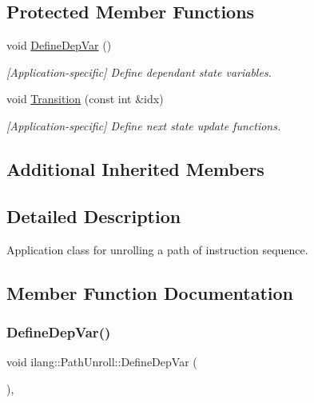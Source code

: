 \subsection*{Protected Member Functions}
\begin{DoxyCompactItemize}
\item 
void \mbox{\hyperlink{classilang_1_1_path_unroll_a862b0d21850b43ff4da423eaf37dc18f}{Define\+Dep\+Var}} ()
\begin{DoxyCompactList}\small\item\em \mbox{[}Application-\/specific\mbox{]} Define dependant state variables. \end{DoxyCompactList}\item 
void \mbox{\hyperlink{classilang_1_1_path_unroll_acb62716a4e43a6a3147f664bb6fecaf9}{Transition}} (const int \&idx)
\begin{DoxyCompactList}\small\item\em \mbox{[}Application-\/specific\mbox{]} Define next state update functions. \end{DoxyCompactList}\end{DoxyCompactItemize}
\subsection*{Additional Inherited Members}


\subsection{Detailed Description}
Application class for unrolling a path of instruction sequence. 

\subsection{Member Function Documentation}
\mbox{\label{classilang_1_1_path_unroll_a862b0d21850b43ff4da423eaf37dc18f}} 
\subsubsection{\texorpdfstring{Define\+Dep\+Var()}{DefineDepVar()}}
{\footnotesize\ttfamily void ilang\+::\+Path\+Unroll\+::\+Define\+Dep\+Var (\begin{DoxyParamCaption}{ }\end{DoxyParamCaption})\hspace{0.3cm}{\ttfamily [protected]}, {\ttfamily [virtual]}}



